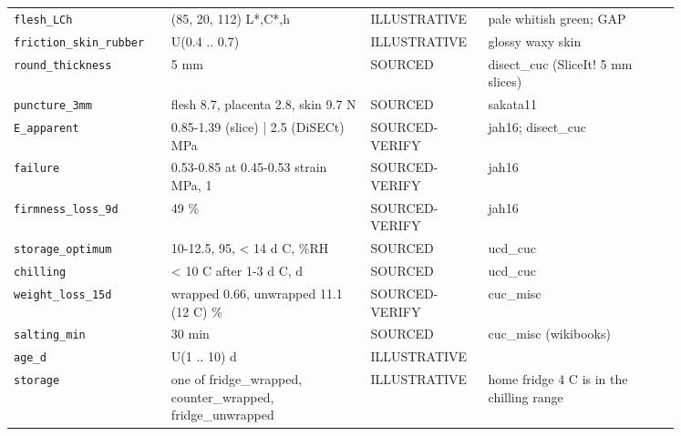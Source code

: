 \documentclass[10.5pt,a4paper]{article}
\begin{document}
{\begin{longtable}{@{}p{0.2\linewidth}p{0.27\linewidth}p{0.12\linewidth}p{0.26\linewidth}@{}}
\texttt{flesh\_\allowbreak{}LCh} & (85, 20, 112) L*,C*,h & ILLUSTRATIVE & pale whitish green; GAP \\
\texttt{friction\_\allowbreak{}skin\_\allowbreak{}rubber} & U(0.4 .. 0.7) & ILLUSTRATIVE & glossy waxy skin \\
\texttt{round\_\allowbreak{}thickness} & 5 mm & SOURCED & disect\_cuc (SliceIt! 5 mm slices) \\
\texttt{puncture\_\allowbreak{}3mm} & flesh 8.7, placenta 2.8, skin 9.7 N & SOURCED & sakata11 \\
\texttt{E\_\allowbreak{}apparent} & 0.85-1.39 (slice) | 2.5 (DiSECt) MPa & SOURCED-VERIFY & jah16; disect\_cuc \\
\texttt{failure} & 0.53-0.85 at 0.45-0.53 strain MPa, 1 & SOURCED-VERIFY & jah16 \\
\texttt{firmness\_\allowbreak{}loss\_\allowbreak{}9d} & 49 \% & SOURCED-VERIFY & jah16 \\
\texttt{storage\_\allowbreak{}optimum} & 10-12.5, 95, < 14 d C, \%RH & SOURCED & ucd\_cuc \\
\texttt{chilling} & < 10 C after 1-3 d C, d & SOURCED & ucd\_cuc \\
\texttt{weight\_\allowbreak{}loss\_\allowbreak{}15d} & wrapped 0.66, unwrapped 11.1 (12 C) \% & SOURCED-VERIFY & cuc\_misc \\
\texttt{salting\_\allowbreak{}min} & 30 min & SOURCED & cuc\_misc (wikibooks) \\
\texttt{age\_\allowbreak{}d} & U(1 .. 10) d & ILLUSTRATIVE &  \\
\texttt{storage} & one of fridge\_wrapped, counter\_wrapped, fridge\_unwrapped & ILLUSTRATIVE & home fridge 4 C is in the chilling range \\\bottomrule\end{longtable}}
\end{document}

